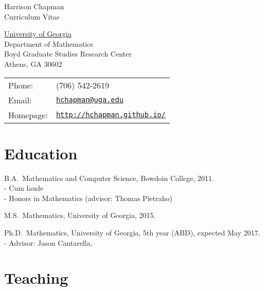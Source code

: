 \documentclass[letterpaper]{article}
\def\name{Harrison Chapman}
\renewenvironment{itemize}{
  \begin{list}{}{
    \setlength{\leftmargin}{1.5em}
  }
}{
  \end{list}
}
\begin{document}
{\huge \name}\\
{\large\sc Curriculum Vitae}


\vspace{0.25in}

\begin{minipage}{0.45\linewidth}
  \href{http://www.uga.edu/}{University of Georgia} \\
  Department of Mathematics \\
  Boyd Graduate Studies Research Center \\
  Athens, GA 30602
\end{minipage}
\begin{minipage}{0.45\linewidth}
  \begin{tabular}{ll}
    Phone: & (706) 542-2619 \\
    Email: & \href{mailto:hchapman@uga.edu}{\tt hchapman@uga.edu} \\
    Homepage: & \href{http://hchapman.github.io/}{\tt http://hchapman.github.io/} \\
  \end{tabular}
\end{minipage}

\section*{Education}

\begin{itemize}
  \item B.A.\ Mathematics and Computer Science, Bowdoin College,
    2011.\\
    - \quad Cum laude \\
    - \quad Honors in Mathematics (advisor: Thomas Pietraho)
  \item M.S.\ Mathematics, University of Georgia, 2015.
  \item Ph.D.\ Mathematics, University of Georgia, 5th year (ABD), expected May
    2017.\\
   - \quad Advisor: Jason Cantarella.
\end{itemize}

\section*{Teaching}
\end{document}
